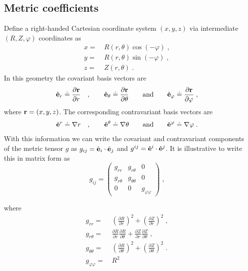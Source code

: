 \subsection{Metric coefficients}

Define a right-handed Cartesian coordinate system $(x,y,z)$ 
via intermediate $(R,Z,\varphi)$ coordinates as 
%
\begin{align}
x =  &~R(r,\theta) \cos(-\varphi) \; , \\
y =  &~R(r,\theta) \sin(-\varphi) \; , \\
z =  &~Z(r,\theta) \; .
\end{align}
%
In this geometry the covariant basis vectors are
%
\begin{equation}
\hat{{\bf e}}_r  \doteq \frac{\partial {\bf r}}{\partial r}\quad, \quad\quad
\hat{{\bf e}}_\theta \doteq \frac{\partial {\bf r}}{\partial \theta}
\quad\quad \mbox{and} \quad\quad 
\hat{{\bf e}}_\varphi \doteq \frac{\partial {\bf r}}{\partial \varphi} \; ,
\label{eq.Bcov}
\end{equation}
%
where ${\bf r}=(x,y,z)$.  The corresponding contravariant basis 
vectors are
%
\begin{equation}
\hat{{\bf e}}^r \doteq \nabla r \quad, \quad\quad
\hat{{\bf e}}^\theta \doteq \nabla \theta
\quad\quad \mbox{and} \quad\quad 
\hat{{\bf e}}^\varphi \doteq \nabla \varphi \; .
\label{eq.Bcont}
\end{equation}
%
With this information we can write the covariant and contravariant 
components of the metric tensor $g$ as 
$g_{ij} = \hat{{\bf e}}_i \cdot \hat{{\bf e}}_j$ and 
$g^{ij} = \hat{{\bf e}}^i \cdot \hat{{\bf e}}^j$.  It is illustrative to 
write this in matrix form as
%
\begin{equation}
g_{ij} = \left(
\begin{array}{ccc}
g_{rr} & g_{r\theta} & 0 \\
g_{r\theta} & g_{\theta\theta} & 0 \\
0      & 0      & g_{\varphi\varphi}
\end{array} \right) \; , 
\end{equation}

\noindent
where
%
\begin{align}
g_{rr} = &~\left( \frac{\partial R}{\partial r} \right)^2
+ \left( \frac{\partial Z}{\partial r} \right)^2 \; , \\
g_{r\theta} = &~\frac{\partial R}{\partial r} \frac{\partial R}{\partial\theta}
+ \frac{\partial Z}{\partial r} \frac{\partial Z}{\partial\theta} \; , \\
g_{\theta\theta} = &~\left( \frac{\partial R}{\partial\theta} \right)^2
+ \left( \frac{\partial Z}{\partial\theta} \right)^2 \; . \\
g_{\varphi\varphi} = &~R^2
\end{align}

